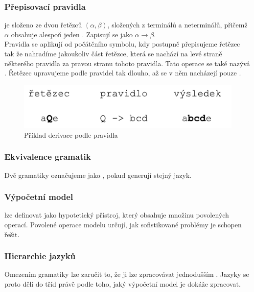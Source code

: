 \subsubsection*{Přepisovací pravidla}
\label{term:rewriteRule}

 je složeno ze dvou řetězců $(\alpha, \beta)$,
složených z terminálů a neterminálů, přičemž $\alpha$ obsahuje alespoň jeden .
Zapisují se jako $\alpha \rightarrow \beta$.\\
Pravidla se aplikují od počátčního symbolu, kdy postupně přepisujeme řetězec tak že nahradíme
jakoukoliv část řetězce, která se nachází na levé straně některého pravidla za pravou stranu tohoto pravidla.
Tato operace se také nazývá .
Řetězec upravujeme podle pravidel tak dlouho, až se v něm nacházejí pouze .

\begin{figure}[H]
  \centering
  \includegraphics{fig/rewriteRule.pdf}
  \caption{Příklad derivace podle pravidla}
  \label{img:rewriteRule}
\end{figure}

\subsubsection*{Ekvivalence gramatik}
Dvě gramatiky označujeme jako , pokud generují stejný jazyk.

\subsubsection*{Výpočetní model}

 lze definovat jako hypotetický přístroj,
který obsahuje množinu povolených operací. Povolené operace modelu určují,
jak sofistikované problémy je schopen řešit.

\subsubsection*{Hierarchie jazyků}
\label{subsec:chomHierarchy}

Omezením gramatiky lze zaručit to, že ji lze zpracovávat jednodušším
. Jazyky se proto
dělí do tříd právě podle toho, jaký výpočetní model je dokáže zpracovat.\\

